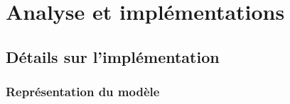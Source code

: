 \part{Analyse et implémentations}
\chapter{Détails sur l'implémentation}
\section{Représentation du modèle}